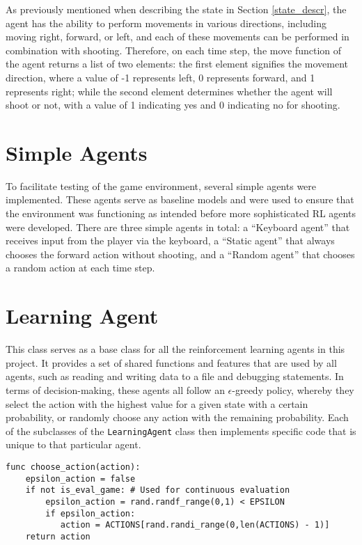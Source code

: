 As previously mentioned when describing the state in Section \ref{state_descr}, the agent has the ability to perform movements in various directions, including moving right, forward, or left, and each of these movements can be performed in combination with shooting. Therefore, on each time step, the move function of the agent returns a list of two elements: the first element signifies the movement direction, where a value of -1 represents left, 0 represents forward, and 1 represents right; while the second element determines whether the agent will shoot or not, with a value of 1 indicating yes and 0 indicating no for shooting.


\section{Simple Agents}
To facilitate testing of the game environment, several simple agents were implemented. These agents serve as baseline models and were used to ensure that the environment was functioning as intended before more sophisticated RL agents were developed. There are three simple agents in total: a ``Keyboard agent'' that receives input from the player via the keyboard, a ``Static agent'' that always chooses the forward action without shooting, and a ``Random agent'' that chooses a random action at each time step. 

\section{Learning Agent}
This class serves as a base class for all the reinforcement learning agents in this project. It provides a set of shared functions and features that are used by all agents, such as reading and writing data to a file and debugging statements. In terms of decision-making, these agents all follow an $\epsilon$-greedy policy, whereby they select the action with the highest value for a given state with a certain probability, or randomly choose any action with the remaining probability. Each of the subclasses of the \texttt{LearningAgent} class then implements specific code that is unique to that particular agent.

\begin{center}
\hrulefill
\begin{lstlisting}
func choose_action(action):
    epsilon_action = false
    if not is_eval_game: # Used for continuous evaluation
        epsilon_action = rand.randf_range(0,1) < EPSILON
        if epsilon_action:
           action = ACTIONS[rand.randi_range(0,len(ACTIONS) - 1)]  
    return action
\end{lstlisting}
\hrulefill
\end{center}

